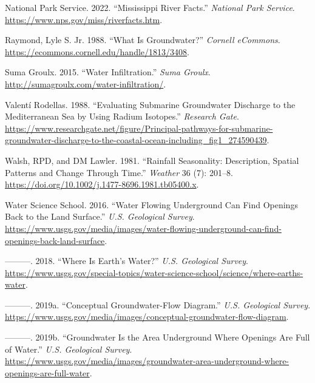 \documentclass[
  letterpaper,
  DIV=11,
  numbers=noendperiod]{scrreprt}
\newlength{\cslhangindent}
\newlength{\cslentryspacingunit} %
\newenvironment{CSLReferences}[2] %
 {%
  \setlength{\parindent}{0pt}
  \ifodd #1
  \let\oldpar\par
  \def\par{\hangindent=\cslhangindent\oldpar}
  \fi
  \setlength{\parskip}{#2\cslentryspacingunit}
 }%
 {}
\begin{document}
\begin{CSLReferences}{1}{0}
\leavevmode{}%
National Park Service. 2022. {``Mississippi River Facts.''}
\emph{National Park Service}.
\url{https://www.nps.gov/miss/riverfacts.htm}.

\leavevmode{}%
Raymond, Lyle S. Jr. 1988. {``What Is Groundwater?''} \emph{Cornell
eCommons}. \url{https://ecommons.cornell.edu/handle/1813/3408}.

\leavevmode{}%
Suma Groulx. 2015. {``Water Infiltration.''} \emph{Suma Groulx}.
\url{http://sumagroulx.com/water-infiltration/}.

\leavevmode{}%
Valentí Rodellas. 1988. {``Evaluating Submarine Groundwater Discharge to
the Mediterranean Sea by Using Radium Isotopes.''} \emph{Research Gate}.
\url{https://www.researchgate.net/figure/Principal-pathways-for-submarine-groundwater-discharge-to-the-coastal-ocean-including_fig1_274590439}.

\leavevmode{}%
Walsh, RPD, and DM Lawler. 1981. {``Rainfall Seasonality: Description,
Spatial Patterns and Change Through Time.''} \emph{Weather} 36 (7):
201--8. \url{https://doi.org/10.1002/j.1477-8696.1981.tb05400.x}.

\leavevmode{}%
Water Science School. 2016. {``Water Flowing Underground Can Find
Openings Back to the Land Surface.''} \emph{U.S. Geological Survey}.
\url{https://www.usgs.gov/media/images/water-flowing-underground-can-find-openings-back-land-surface}.

\leavevmode{}%
---------. 2018. {``Where Is Earth's Water?''} \emph{U.S. Geological
Survey}.
\url{https://www.usgs.gov/special-topics/water-science-school/science/where-earths-water}.

\leavevmode{}%
---------. 2019a. {``Conceptual Groundwater-Flow Diagram.''} \emph{U.S.
Geological Survey}.
\url{https://www.usgs.gov/media/images/conceptual-groundwater-flow-diagram}.

\leavevmode{}%
---------. 2019b. {``Groundwater Is the Area Underground Where Openings
Are Full of Water.''} \emph{U.S. Geological Survey}.
\url{https://www.usgs.gov/media/images/groundwater-area-underground-where-openings-are-full-water}.


\end{CSLReferences}
\end{document}
